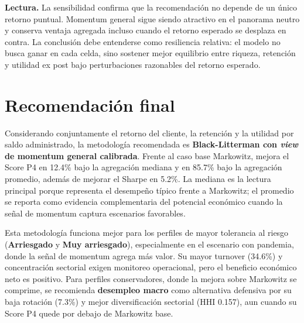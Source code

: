 \medskip
\noindent\textbf{Lectura.} La sensibilidad confirma que la recomendaci\'on no
depende de un \'unico retorno puntual. Momentum general sigue siendo atractivo
en el panorama neutro y conserva ventaja agregada incluso cuando el retorno
esperado se desplaza en contra. La conclusi\'on debe entenderse como resiliencia
relativa: el modelo no busca ganar en cada celda, sino sostener mejor equilibrio
entre riqueza, retenci\'on y utilidad ex post bajo perturbaciones razonables del
retorno esperado.

\section{Recomendaci\'on final}

Considerando conjuntamente el retorno del cliente, la retenci\'on y la utilidad
por saldo administrado, la metodolog\'ia recomendada es \textbf{Black-Litterman
con \textit{view} de momentum general calibrada}. Frente al caso base Markowitz,
mejora el Score P4 en 12.4\% bajo la agregaci\'on mediana y en 85.7\% bajo la
agregaci\'on promedio, adem\'as de mejorar el Sharpe en 5.2\%. La mediana es la
lectura principal porque representa el desempe\~no t\'ipico frente a Markowitz;
el promedio se reporta como evidencia complementaria del potencial econ\'omico
cuando la se\~nal de momentum captura escenarios favorables.

Esta metodolog\'ia funciona mejor para los perfiles de mayor tolerancia al
riesgo (\textbf{Arriesgado} y \textbf{Muy arriesgado}), especialmente en el
escenario con pandemia, donde la se\~nal de momentum agrega m\'as valor. Su mayor
turnover (34.6\%) y concentraci\'on sectorial exigen monitoreo operacional, pero
el beneficio econ\'omico neto es positivo. Para perfiles conservadores, donde la
mejora sobre Markowitz se comprime, se recomienda \textbf{desempleo macro} como
alternativa defensiva por su baja rotaci\'on (7.3\%) y mejor diversificaci\'on
sectorial (HHI 0.157), aun cuando su Score P4 quede por debajo de Markowitz base.
